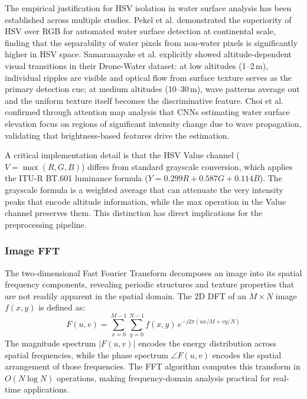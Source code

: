    The empirical justification for HSV isolation in water surface analysis has been established across multiple studies. Pekel et al. \cite{Pekel2016} demonstrated the superiority of HSV over RGB for automated water surface detection at continental scale, finding that the separability of water pixels from non-water pixels is significantly higher in HSV space. Samaranayake et al. \cite{SAMARANAYAKE2023103933} explicitly showed altitude-dependent visual transitions in their Drone-Water dataset: at low altitudes (1--2\,m), individual ripples are visible and optical flow from surface texture serves as the primary detection cue; at medium altitudes (10--30\,m), wave patterns average out and the uniform texture itself becomes the discriminative feature. Choi et al. \cite{CHEN2022110819} confirmed through attention map analysis that CNNs estimating water surface elevation focus on regions of significant intensity change due to wave propagation, validating that brightness-based features drive the estimation.

    A critical implementation detail is that the HSV Value channel ($V = \max(R, G, B)$) differs from standard grayscale conversion, which applies the ITU-R BT.601 luminance formula ($Y = 0.299R + 0.587G + 0.114B$). The grayscale formula is a weighted average that can attenuate the very intensity peaks that encode altitude information, while the max operation in the Value channel preserves them. This distinction has direct implications for the preprocessing pipeline.

    \subsubsection{Image FFT}

    The two-dimensional Fast Fourier Transform decomposes an image into its spatial frequency components, revealing periodic structures and texture properties that are not readily apparent in the spatial domain. The 2D DFT of an $M \times N$ image $f(x, y)$ is defined as:
    \begin{equation}
        F(u, v) = \sum_{x=0}^{M-1} \sum_{y=0}^{N-1} f(x, y) \, e^{-j2\pi(ux/M + vy/N)}
        \label{eq:2d_dft}
    \end{equation}
    The magnitude spectrum $|F(u, v)|$ encodes the energy distribution across spatial frequencies, while the phase spectrum $\angle F(u, v)$ encodes the spatial arrangement of those frequencies. The FFT algorithm \cite{CooleyTukey1965} computes this transform in $O(N \log N)$ operations, making frequency-domain analysis practical for real-time applications.

